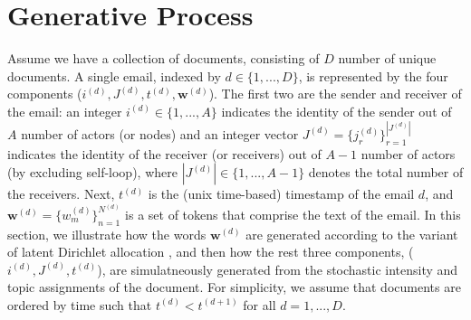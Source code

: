 \documentclass[a4paper]{article}
\begin{document}

\section{Generative Process} \label{sec: Generative Process}
Assume we have a collection of documents, consisting of $D$ number of unique documents. A single email, indexed by $d \in \{1,...,D\}$, is represented by the four components ($i^{(d)}, J^{(d)}, t^{(d)},  \boldsymbol{w}^{(d)}$). The first two are the sender and receiver of the email: an integer $i^{(d)} \in \{1,...,A\}$ indicates the identity of the sender out of $A$ number of actors (or nodes) and an integer vector $J^{(d)} = \{j_r^{(d)}\}_{r=1}^{|J^{(d)}|} $ indicates the identity of the receiver (or receivers) out of $A-1$ number of actors (by excluding self-loop), where $|J^{(d)}|\in \{1,...,A-1\}$ denotes the total number of the receivers. Next, $t^{(d)}$ is the (unix time-based) timestamp of the email $d$, and $\boldsymbol{w}^{(d)} = \{w^{(d)}_m \}_{n=1}^{N^{(d)}}$ is a set of tokens that comprise the text of the email. In this section, we illustrate how the words $\boldsymbol{w}^{(d)}$ are generated according to the variant of latent Dirichlet allocation \citep{Blei2003}, and then how the rest three components, ($i^{(d)}, J^{(d)}, t^{(d)}$), are simulatneously generated from the stochastic intensity and topic assignments of the document. For simplicity, we assume that documents are ordered by time such that $t^{(d)} < t^{(d+1)}$ for all $d=1, ..., D$.
\end{document}
